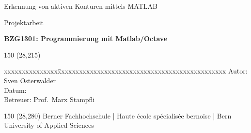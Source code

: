 \begin{titlepage}
\begin{flushleft}

\vspace*{120mm}

\fontsize{26pt}{28pt}\selectfont
Erkennung von aktiven Konturen mittels MATLAB
\vspace{3mm}

\fontsize{20pt}{22pt}\selectfont
Projektarbeit
\vspace{3mm}

\fontsize{10pt}{12pt}\selectfont
\textbf{BZG1301: Programmierung mit Matlab/Octave} \\
\vspace{3mm}

\begin{textblock}{150} (28,215)
\fontsize{10pt}{17pt}\selectfont
\begin{tabbing}
xxxxxxxxxxxxxxx\=xxxxxxxxxxxxxxxxxxxxxxxxxxxxxxxxxxxxxxxxxxxxxxx \kill
Autor:        \> Sven Osterwalder\\
Datum:        \> \versiondate\\
Betreuer:     \> Prof.\ Marx Stampfli\\
\end{tabbing}

\end{textblock}
\end{flushleft}

\begin{textblock}{150} (28,280)
\noindent 
\color{bfhgrey}\fontsize{9pt}{10pt}\selectfont
Berner Fachhochschule | Haute école spécialisée bernoise | Bern University of Applied Sciences
\color{black}\selectfont
\end{textblock}


\end{titlepage}
